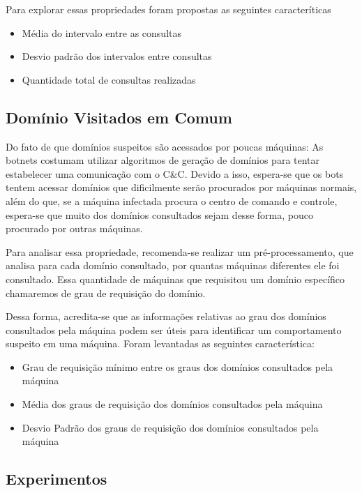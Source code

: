 Para explorar essas propriedades foram propostas as seguintes caracteríticas

\begin{itemize}
\item Média do intervalo entre as consultas
\item Desvio padrão dos intervalos entre consultas
\item Quantidade total de consultas realizadas
\end{itemize}

\subsection{Domínio Visitados em Comum}
Do fato de que domínios suspeitos são acessados por poucas máquinas: As botnets costumam utilizar algoritmos de geração de domínios para tentar estabelecer uma comunicação com o C\&C. Devido a isso, espera-se que os bots tentem acessar domínios que dificilmente serão procurados por máquinas normais, além do que, se a máquina infectada procura o centro de comando e controle, espera-se que muito dos domínios consultados sejam desse forma, pouco procurado por outras máquinas.

Para analisar essa propriedade, recomenda-se realizar um pré-processamento, que analisa para cada domínio consultado, por quantas máquinas diferentes ele foi consultado. Essa quantidade de máquinas que requisitou um domínio específico chamaremos de grau de requisição do domínio.

Dessa forma, acredita-se que as informações relativas ao grau dos domínios consultados pela máquina podem ser úteis para identificar um comportamento suspeito em uma máquina. Foram levantadas as seguintes característica:

\begin{itemize}
\item Grau de requisição mínimo entre os graus dos domínios consultados pela máquina
\item Média dos graus de requisição dos domínios consultados pela máquina
\item Desvio Padrão dos graus de requisição dos domínios consultados pela máquina

\end{itemize}

\subsection{Experimentos}


